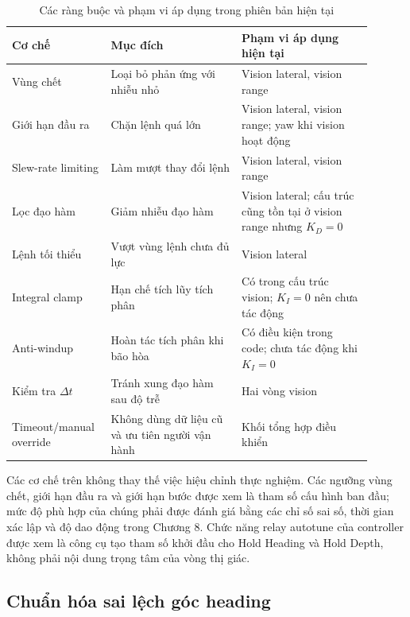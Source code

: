 \documentclass[../DoAn.tex]{subfiles}
\begin{document}
\begin{table}[htbp]
    \centering
    \caption{Các ràng buộc và phạm vi áp dụng trong phiên bản hiện tại}
    \label{tab:rangbuoc_dieukhien}
    \renewcommand{\arraystretch}{1.2}
    \begin{tabular}{|p{0.22\linewidth}|p{0.34\linewidth}|p{0.34\linewidth}|}
        \hline
        \textbf{Cơ chế} & \textbf{Mục đích} & \textbf{Phạm vi áp dụng hiện tại} \\
        \hline
        Vùng chết & Loại bỏ phản ứng với nhiễu nhỏ & Vision lateral, vision range \\
        \hline
        Giới hạn đầu ra & Chặn lệnh quá lớn & Vision lateral, vision range; yaw khi vision hoạt động \\
        \hline
        Slew-rate limiting & Làm mượt thay đổi lệnh & Vision lateral, vision range \\
        \hline
        Lọc đạo hàm & Giảm nhiễu đạo hàm & Vision lateral; cấu trúc cũng tồn tại ở vision range nhưng $K_D = 0$ \\
        \hline
        Lệnh tối thiểu & Vượt vùng lệnh chưa đủ lực & Vision lateral \\
        \hline
        Integral clamp & Hạn chế tích lũy tích phân & Có trong cấu trúc vision; $K_I = 0$ nên chưa tác động \\
        \hline
        Anti-windup & Hoàn tác tích phân khi bão hòa & Có điều kiện trong code; chưa tác động khi $K_I = 0$ \\
        \hline
        Kiểm tra $\Delta t$ & Tránh xung đạo hàm sau độ trễ & Hai vòng vision \\
        \hline
        Timeout/manual override & Không dùng dữ liệu cũ và ưu tiên người vận hành & Khối tổng hợp điều khiển \\
        \hline
    \end{tabular}
\end{table}

Các cơ chế trên không thay thế việc hiệu chỉnh thực nghiệm. Các ngưỡng vùng chết, giới hạn đầu ra và giới hạn bước được xem là tham số cấu hình ban đầu; mức độ phù hợp của chúng phải được đánh giá bằng các chỉ số sai số, thời gian xác lập và độ dao động trong Chương 8. Chức năng relay autotune của controller được xem là công cụ tạo tham số khởi đầu cho Hold Heading và Hold Depth, không phải nội dung trọng tâm của vòng thị giác.

\subsection{Chuẩn hóa sai lệch góc heading}
\end{document}
